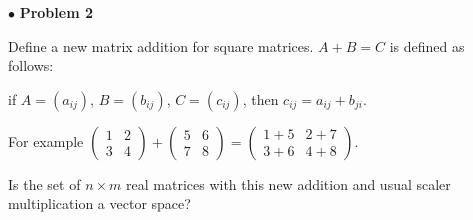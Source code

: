\documentclass{article}
\begin{document}
\newpage
$\bullet$ \textbf{Problem 2} 
\medskip

\begin{itshape}
Define a new matrix addition for square matrices. $A+B=C$ is defined as follows:

if $A=(a_{ij})$, $B=(b_{ij})$, $C=(c_{ij})$, then $c_{ij}=a_{ij}+b_{ji}$.

For example 
$ \begin{pmatrix} 1 & 2 \\ 3 & 4 \end{pmatrix} + \begin{pmatrix} 5 & 6 \\ 7 & 8 \end{pmatrix} = \begin{pmatrix} 1+5 & 2+7 \\ 3+6 & 4+8 \end{pmatrix}$.

Is the set of $n \times m$ real matrices with this new addition and usual scaler multiplication a vector space?
\end{itshape}
\medskip
\end{document}

